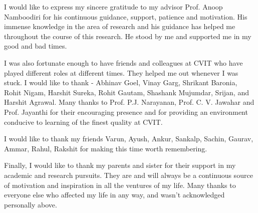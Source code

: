 I would like to express my sincere gratitude to my advisor Prof. Anoop Namboodiri
for his continuous guidance, support, patience and motivation. His immense knowledge in the area of
research and his guidance has helped me throughout the course of this research. He stood by me and supported me in my good and bad times.

I was also fortunate enough to have friends and colleagues at CVIT who have played
different roles at different times. They helped me out whenever I was stuck. I would like to thank - Abhinav Goel, Vinay Garg,
Shrikant Baronia, Rohit Nigam, Harshit Sureka, Rohit Gautam, Shashank Mujumdar, Srijan, and Harshit Agrawal. 
Many thanks to Prof. P.J. Narayanan, Prof. C. V. Jawahar and Prof. Jayanthi 
 for their encouraging presence and for providing an environment conducive to learning of
the finest quality at CVIT.

I would like to thank my friends Varun, Ayush, Ankur, Sankalp, Sachin, Gaurav, Ammar, Rahul, Rakshit for making this time worth remembering.

Finally, I would like to thank my parents and sister for their support in my academic and research pursuits.
They are and will always be a continuous source of motivation and inspiration in all the
ventures of my life. 
Many thanks to everyone else who affected my life in any way, and wasn't acknowledged personally
above.